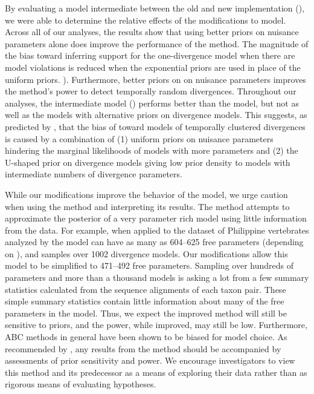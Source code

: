 \documentclass[letterpaper,12pt]{article}
\begin{document}
\begin{linenumbers}
By evaluating a model intermediate between the old and new implementation
(\modelUshaped), we were able to determine the relative effects of the
modifications to model.
Across all of our analyses, the results show that using better priors on
nuisance parameters alone does improve the performance of the method.
The magnitude of the bias toward inferring support for the one-divergence
model when there are model violations is reduced when the exponential
priors are used in place of the uniform priors.
).
Furthermore, better priors on on nuisance parameters improves the method's
power to detect temporally random divergences.
Throughout our analyses, the intermediate model (\modelUshaped) performs
better than the \msb model, but not as well as the models with alternative
priors on divergence models.
This suggests, as predicted by \citet{Oaks2012}, that the bias of \msb toward
models of temporally clustered divergences is caused by a combination of
(1) uniform priors on nuisance parameters hindering the marginal likelihoods of
models with more \divTime{} parameters and
(2) the U-shaped prior on divergence models giving low prior density to models
with intermediate numbers of divergence parameters.

While our modifications improve the behavior of the model, we urge
caution when using the method and interpreting its results.
The method attempts to approximate the posterior of a very parameter rich model
using little information from the data.
For example, when applied to the dataset of Philippine vertebrates analyzed by
\citet{Oaks2012} the model can have as many as 604--625 free parameters
(depending on \divTimeNum), and samples over 1002 divergence models.
Our modifications allow this model to be simplified to 471--492 free
parameters.
Sampling over hundreds of parameters and more than a thousand models is asking
a lot from a few summary statistics calculated from the sequence alignments of
each taxon pair.
These simple summary statistics contain little information about many
of the free parameters in the model.
Thus, we expect the improved method will still be sensitive to priors, and the
power, while improved, may still be low.
Furthermore, ABC methods in general have been shown to be biased
\citep{Robert2011} for model choice.
As recommended by \citet{Oaks2012}, any results from the method should be
accompanied by assessments of prior sensitivity and power.
We encourage investigators to view this method and its predecessor as a means
of exploring their data rather than as rigorous means of evaluating hypotheses.


\end{linenumbers}
\end{document}
